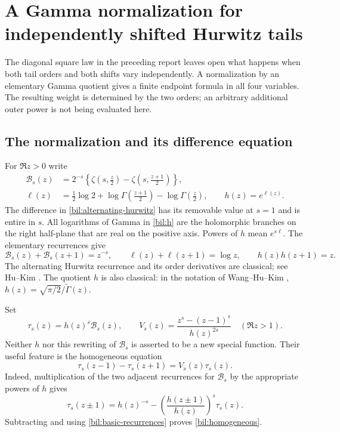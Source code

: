 \section{A Gamma normalization for independently shifted Hurwitz tails}
\label{bil:section}

The diagonal square law in the preceding report leaves open what happens
when both tail orders and both shifts vary independently. A normalization
by an elementary Gamma quotient gives a finite endpoint formula in all
four variables. The resulting weight is determined by the two orders;
an arbitrary additional outer power is not being evaluated here.

\subsection{The normalization and its difference equation}

For $\Re z>0$ write
\begin{align}
 \mathcal B_s(z)
 &=2^{-s}\left\{\zeta\left(s,\frac z2\right)
                    -\zeta\left(s,\frac{z+1}{2}\right)\right\},
                    \label{bil:alternating-hurwitz}\\
 \ell(z)&=\frac12\log2+\log\Gamma\left(\frac{z+1}{2}\right)
                     -\log\Gamma\left(\frac z2\right),\qquad
 h(z)=e^{\ell(z)}.\label{bil:h}
\end{align}
The difference in \eqref{bil:alternating-hurwitz} has its removable
value at $s=1$ and is entire in $s$. All logarithms of Gamma in
\eqref{bil:h} are the holomorphic branches on the right half-plane that
are real on the positive axis. Powers of $h$ mean $e^{s\ell}$.
The elementary recurrences give
\begin{equation}\label{bil:basic-recurrences}
 \mathcal B_s(z)+\mathcal B_s(z+1)=z^{-s},\qquad
 \ell(z)+\ell(z+1)=\log z,\qquad h(z)h(z+1)=z.
\end{equation}
The alternating Hurwitz recurrence and its order derivatives are
classical; see Hu--Kim \cite{bil:HuKim}. The quotient $h$ is also
classical: in the notation of Wang--Hu--Kim \cite{bil:WangHuKim},
$h(z)=\sqrt{\pi/2}/\widetilde\Gamma(z)$.

Set
\begin{equation}\label{bil:tau-v}
 \tau_s(z)=h(z)^s\mathcal B_s(z),\qquad
 V_s(z)=\frac{z^s-(z-1)^s}{h(z)^{2s}}\quad(\Re z>1).
\end{equation}
Neither $h$ nor this rewriting of $\mathcal B_s$ is asserted to be a
new special function. Their useful feature is the homogeneous equation
\begin{equation}\label{bil:homogeneous}
 \boxed{\tau_s(z-1)-\tau_s(z+1)=V_s(z)\tau_s(z).}
\end{equation}
Indeed, multiplication of the two adjacent recurrences for
$\mathcal B_s$ by the appropriate powers of $h$ gives
\[
 \tau_s(z\pm1)=h(z)^{-s}
                  -\left(\frac{h(z\pm1)}{h(z)}\right)^s\tau_s(z).
\]
Subtracting and using \eqref{bil:basic-recurrences} proves
\eqref{bil:homogeneous}.

